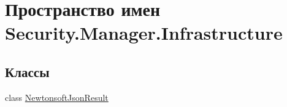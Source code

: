 \hypertarget{namespace_security_1_1_manager_1_1_infrastructure}{}\section{Пространство имен Security.\+Manager.\+Infrastructure}
\label{namespace_security_1_1_manager_1_1_infrastructure}
\subsection*{Классы}
\begin{DoxyCompactItemize}
\item 
class \hyperlink{class_security_1_1_manager_1_1_infrastructure_1_1_newtonsoft_json_result}{Newtonsoft\+Json\+Result}
\end{DoxyCompactItemize}
